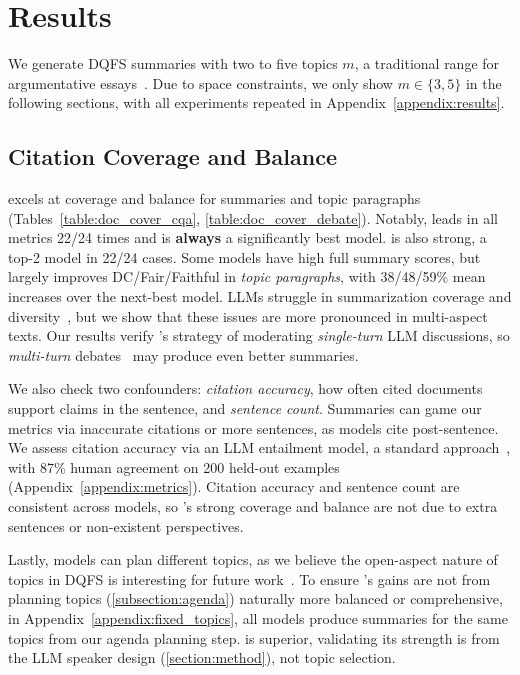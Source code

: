 

\section{Results}

We generate DQFS summaries with two to five topics $m$, a traditional range for argumentative essays~\cite{mery2019use}.
Due to space constraints, we only show $m \in \{3, 5\}$ in the following sections, with all experiments repeated in Appendix~\ref{appendix:results}.

\subsection{Citation Coverage and Balance} \label{subsection:citation_comp}

\model excels at coverage and balance for summaries and topic paragraphs (Tables~\ref{table:doc_cover_cqa}, \ref{table:doc_cover_debate}).
Notably, \modelTopic leads in all metrics 22/24 times and is \textbf{always} a significantly best model.
\modelAll is also strong, a top-2 model in 22/24 cases.
Some models have high full summary scores, but \modelTopic largely improves DC/Fair/Faithful in \textit{topic paragraphs}, with 38/48/59\% mean increases over the next-best model. 
LLMs struggle in summarization coverage and diversity~\cite{huang-etal-2024-embrace, zhang-etal-2024-fair}, but we show that these issues are more pronounced in multi-aspect texts.
Our results verify \model's strategy of moderating \textit{single-turn} LLM discussions, so \textit{multi-turn} debates~\cite{khan2024debating} may produce even better summaries.

We also check two confounders: \textit{citation accuracy}, how often cited documents support claims in the sentence, and \textit{sentence count}.
Summaries can game our metrics via inaccurate citations or more sentences, as models cite post-sentence.
We assess citation accuracy via an LLM entailment model, a standard approach~\cite{gao2023enabling, balepur-etal-2023-text}, with 87\% human agreement on 200 held-out examples (Appendix~\ref{appendix:metrics}).
Citation accuracy and sentence count are consistent across models, so \model's strong coverage and balance are not due to extra sentences or non-existent perspectives.

Lastly, models can plan different topics, as we believe the open-aspect nature of topics in DQFS is interesting for future work~\cite{amar2023openasp}.
To ensure \model's gains are not from planning topics (\cref{subsection:agenda}) naturally more balanced or comprehensive, in Appendix~\ref{appendix:fixed_topics}, all models produce summaries for the same topics from our agenda planning step. 
\model is superior, validating its strength is from the LLM speaker design (\cref{section:method}), not topic selection.

